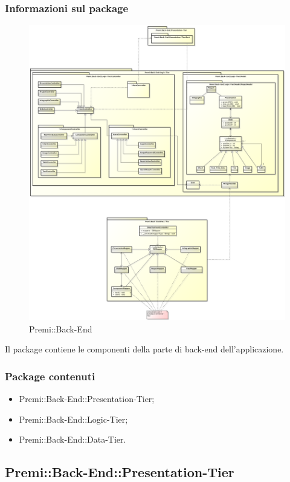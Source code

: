 	\subsubsection*{Informazioni sul package}
		\begin{figure}[h]
			\centering
			\includegraphics[width=\linewidth]{img/back-end}
			\caption[Premi::Back-End]{Premi::Back-End}
		\end{figure}
		Il package contiene le componenti della parte di back-end dell'applicazione.
		
	\subsubsection*{Package contenuti}
		\begin{itemize}
			\item Premi::Back-End::Presentation-Tier;
			\item Premi::Back-End::Logic-Tier;
			\item Premi::Back-End::Data-Tier.
		\end{itemize}


\subsection{Premi::Back-End::Presentation-Tier}
